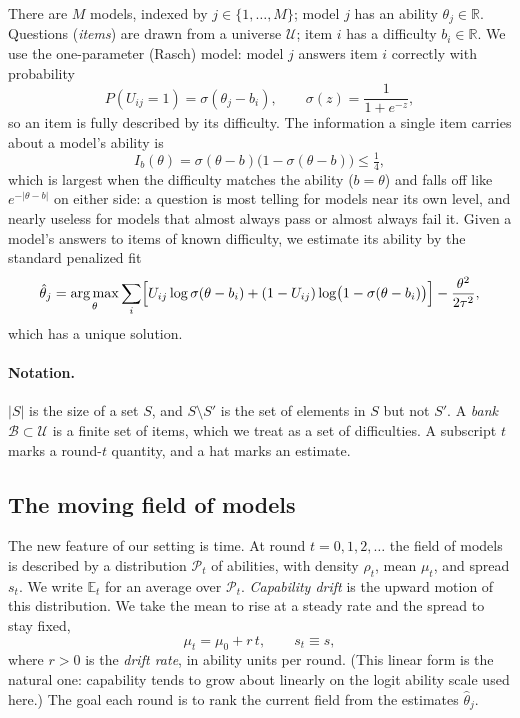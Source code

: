 \documentclass[11pt]{article}
\newcommand{\sigm}{\sigma}
\newcommand{\E}{\mathbb{E}}
\newcommand{\R}{\mathbb{R}}
\newcommand{\cB}{\mathcal{B}}
\newcommand{\cU}{\mathcal{U}}
\newcommand{\cP}{\mathcal{P}}
\DeclareMathOperator*{\argmax}{arg\,max}
\theoremstyle{plain}
\theoremstyle{definition}
\theoremstyle{remark}
\begin{document}
There are $M$ models, indexed by $j\in\{1,\dots,M\}$; model $j$ has an ability
$\theta_j\in\R$. Questions (\emph{items}) are drawn from a universe $\cU$;
item $i$ has a difficulty $b_i\in\R$. We use the one-parameter (Rasch) model: model
$j$ answers item $i$ correctly with probability
\begin{equation}
P(U_{ij}=1)=\sigm(\theta_j-b_i),\qquad \sigm(z)=\frac{1}{1+e^{-z}},
\label{eq:rasch}
\end{equation}
so an item is fully described by its difficulty. The information a single item
carries about a model's ability is
\begin{equation}
I_b(\theta)=\sigm(\theta-b)\bigl(1-\sigm(\theta-b)\bigr)\le\tfrac14,
\label{eq:info}
\end{equation}
which is largest when the difficulty matches the ability ($b=\theta$) and falls off
like $e^{-|\theta-b|}$ on either side: a question is most telling for models near its
own level, and nearly useless for models that almost always pass or almost always
fail it. Given a model's answers to items of known difficulty, we estimate its
ability by the standard penalized fit
\begin{equation}
\hat\theta_j=\argmax_{\theta}\sum_i\Bigl[U_{ij}\log\sigm(\theta-b_i)
+(1-U_{ij})\log\bigl(1-\sigm(\theta-b_i)\bigr)\Bigr]-\frac{\theta^2}{2\tau^2},
\label{eq:fit}
\end{equation}
which has a unique solution.

\paragraph{Notation.} $|S|$ is the size of a set $S$, and $S\setminus S'$ is the set
of elements in $S$ but not $S'$. A \emph{bank} $\cB\subset\cU$ is a finite set
of items, which we treat as a set of difficulties. A subscript $t$ marks a round-$t$
quantity, and a hat marks an estimate.

\subsection{The moving field of models}
\label{sec:field}

The new feature of our setting is time. At round $t=0,1,2,\dots$ the field of models
is described by a distribution $\cP_t$ of abilities, with density $\rho_t$, mean
$\mu_t$, and spread $s_t$. We write $\E_t$ for an average over $\cP_t$.
\emph{Capability drift} is the upward motion of this distribution. We take the mean
to rise at a steady rate and the spread to stay fixed,
\begin{equation}
\mu_t=\mu_0+r\,t,\qquad s_t\equiv s,
\label{eq:drift}
\end{equation}
where $r>0$ is the \emph{drift rate}, in ability units per round. (This linear form
is the natural one: capability tends to grow about linearly on the logit ability
scale used here.) The goal each round is to rank the current field from the
estimates $\hat\theta_j$.
\end{document}

